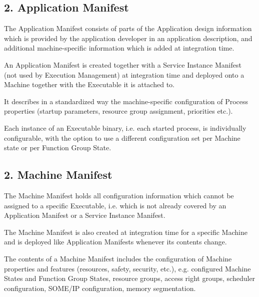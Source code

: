 \subsection*{2. {\bfseries Application Manifest}}


\begin{DoxyItemize}
\item The Application Manifest consists of parts of the Application design information which is provided by the application developer in an application description, and additional machine-\/specific information which is added at integration time.
\item An Application Manifest is created together with a Service Instance Manifest (not used by Execution Management) at integration time and deployed onto a Machine together with the Executable it is attached to.
\item It describes in a standardized way the machine-\/specific configuration of Process properties (startup parameters, resource group assignment, priorities etc.).
\item Each instance of an Executable binary, i.\+e. each started process, is individually configurable, with the option to use a different configuration set per Machine state or per Function Group State.
\end{DoxyItemize}

\subsection*{2. {\bfseries Machine Manifest}}


\begin{DoxyItemize}
\item The Machine Manifest holds all configuration information which cannot be assigned to a specific Executable, i.\+e. which is not already covered by an Application Manifest or a Service Instance Manifest.
\item The Machine Manifest is also created at integration time for a specific Machine and is deployed like Application Manifests whenever its contents change.
\item The contents of a Machine Manifest includes the configuration of Machine properties and features (resources, safety, security, etc.), e.\+g. configured Machine States and Function Group States, resource groups, access right groups, scheduler configuration, S\+O\+M\+E/\+IP configuration, memory segmentation.
\end{DoxyItemize}

